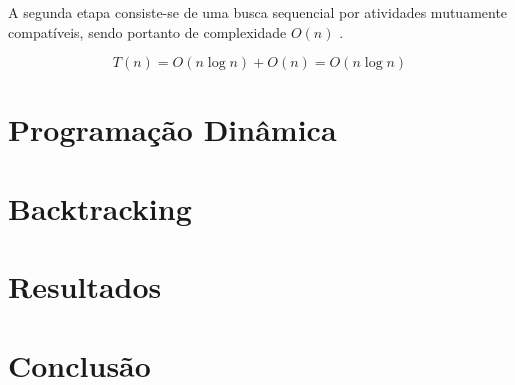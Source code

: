 \documentclass[12pt]{article}
\begin{document}
A segunda etapa consiste-se de uma busca sequencial por atividades mutuamente compatíveis, sendo portanto de complexidade $O(n)$ .

\begin{equation}
T(n) = O(n\log{}n) + O(n) = O(n\log{}n)
\end{equation}

\section{Programação Dinâmica}


\section{Backtracking}

\section{Resultados}

\section{Conclusão}



\end{document}
